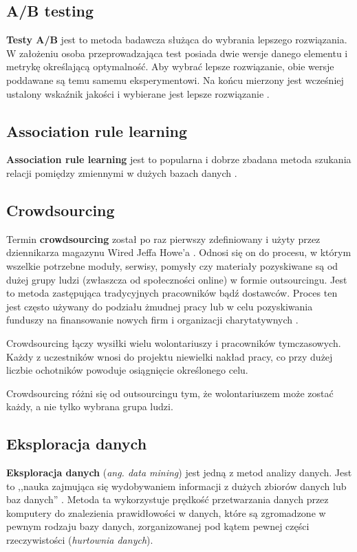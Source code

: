 \documentclass[10pt,twocolumn]{llncs}          %
\begin{document}
\subsection{A/B testing}
\label{sub:a/b_testing}
\textbf{Testy A/B} jest to metoda badawcza służąca do wybrania lepszego rozwiązania. W założeniu osoba przeprowadzająca test posiada dwie wersje danego elementu i metrykę określającą optymalność. Aby wybrać lepsze rozwiązanie, obie wersje poddawane są temu samemu eksperymentowi. Na końcu mierzony jest wcześniej ustalony wskaźnik jakości i wybierane jest lepsze rozwiązanie \cite{paras10}.

\subsection{Association rule learning}
\label{sub:association_rule_learning}
\textbf{Association rule learning} jest to popularna i dobrze zbadana metoda szukania relacji pomiędzy zmiennymi w dużych bazach danych \cite{tan2005introduction}.

\subsection{Crowdsourcing}
\label{sub:crowdsourcing}
Termin \textbf{crowdsourcing} został po raz pierwszy zdefiniowany i użyty przez dziennikarza magazynu Wired Jeffa Howe’a \cite{Howe2006}. Odnosi się on do procesu, w którym wszelkie potrzebne moduły, serwisy, pomysły czy materiały pozyskiwane są od dużej grupy ludzi (zwłaszcza od społeczności online) w formie outsourcingu. Jest to metoda zastępująca tradycyjnych pracowników bądź dostawców. Proces ten jest często używany do podziału żmudnej pracy lub w celu pozyskiwania funduszy na finansowanie nowych firm i organizacji charytatywnych \cite{Howe2006}.

Crowdsourcing łączy wysiłki wielu wolontariuszy i pracowników tymczasowych. Każdy z uczestników wnosi do projektu niewielki nakład pracy, co przy dużej liczbie ochotników powoduje osiągnięcie określonego celu.

Crowdsourcing różni się od outsourcingu tym, że wolontariuszem może zostać każdy, a nie tylko wybrana grupa ludzi.

\subsection{Eksploracja danych}
\label{sub:eksploracja_danych}
\textbf{Eksploracja danych} (\textit{ang. data mining}) jest jedną z metod analizy danych. Jest to ,,nauka zajmująca się wydobywaniem informacji z dużych zbiorów danych lub baz danych'' \cite{Hand01}. Metoda ta wykorzystuje prędkość przetwarzania danych przez komputery do znalezienia prawidłowości w danych, które są zgromadzone w pewnym rodzaju bazy danych, zorganizowanej pod kątem pewnej części rzeczywistości (\textit{hurtownia danych}). 
\end{document}
